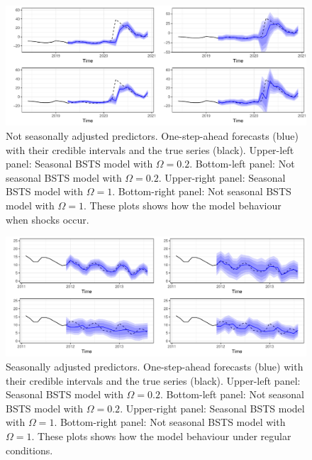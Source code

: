 \documentclass[
  12pt,
]{book}
\theoremstyle{break}
\theoremstyle{nonumberplain}
\begin{document}
\begin{figure}[H]

{\centering \includegraphics{Dynamic-Shrinkage-in-Bayesian-Structural-Time-Series-and-Vector-Autoregressive-Models_files/figure-latex/myfig118-1} 

}

\caption{Not seasonally adjusted predictors. One-step-ahead forecasts (blue) with their credible intervals and the true series (black). Upper-left panel: Seasonal BSTS model with $\Omega=0.2$. Bottom-left panel: Not seasonal BSTS model with $\Omega=0.2$. Upper-right panel: Seasonal BSTS model with $\Omega=1$. Bottom-right panel: Not seasonal BSTS model with $\Omega=1$. These plots shows how the model behaviour when shocks occur.}\label{fig:myfig118}
\end{figure}

\begin{figure}[H]

{\centering \includegraphics{Dynamic-Shrinkage-in-Bayesian-Structural-Time-Series-and-Vector-Autoregressive-Models_files/figure-latex/myfig119-1} 

}

\caption{Seasonally adjusted predictors. One-step-ahead forecasts (blue) with their credible intervals and the true series (black). Upper-left panel: Seasonal BSTS model with $\Omega=0.2$. Bottom-left panel: Not seasonal BSTS model with $\Omega=0.2$. Upper-right panel: Seasonal BSTS model with $\Omega=1$. Bottom-right panel: Not seasonal BSTS model with $\Omega=1$. These plots shows how the model behaviour under regular conditions.}\label{fig:myfig119}
\end{figure}
\end{document}

